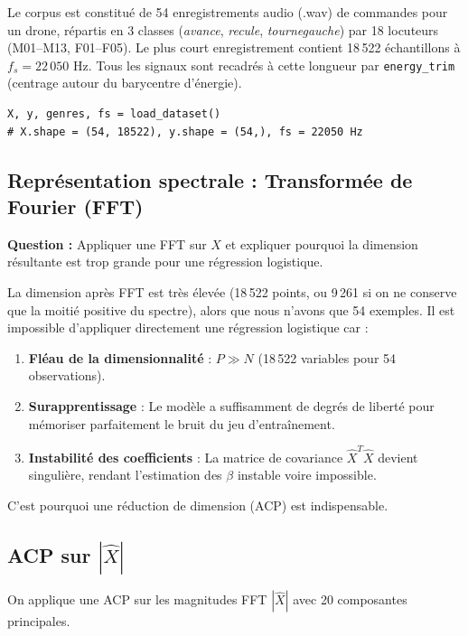 \documentclass{name}
\begin{document}
Le corpus est constitué de 54 enregistrements audio (.wav) de commandes pour un drone, répartis en 3 classes (\textit{avance}, \textit{recule}, \textit{tournegauche}) par 18 locuteurs (M01--M13, F01--F05). Le plus court enregistrement contient 18\,522 échantillons à $f_s = 22\,050$ Hz. Tous les signaux sont recadrés à cette longueur par \texttt{energy\_trim} (centrage autour du barycentre d'énergie).

\begin{lstlisting}[caption={Chargement du dataset}]
X, y, genres, fs = load_dataset()
# X.shape = (54, 18522), y.shape = (54,), fs = 22050 Hz
\end{lstlisting}

\subsection{Représentation spectrale : Transformée de Fourier (FFT)}

\textbf{Question :} Appliquer une FFT sur $X$ et expliquer pourquoi la dimension résultante est trop grande pour une régression logistique.

La dimension après FFT est très élevée (18\,522 points, ou 9\,261 si on ne conserve que la moitié positive du spectre), alors que nous n'avons que 54 exemples. Il est impossible d'appliquer directement une régression logistique car :

\begin{enumerate}
    \item \textbf{Fléau de la dimensionnalité} : $P \gg N$ (18\,522 variables pour 54 observations).
    \item \textbf{Surapprentissage} : Le modèle a suffisamment de degrés de liberté pour mémoriser parfaitement le bruit du jeu d'entraînement.
    \item \textbf{Instabilité des coefficients} : La matrice de covariance $\hat{X}^T\hat{X}$ devient singulière, rendant l'estimation des $\beta$ instable voire impossible.
\end{enumerate}

C'est pourquoi une réduction de dimension (ACP) est indispensable.

\subsection{ACP sur $|\hat{X}|$}

On applique une ACP sur les magnitudes FFT $|\hat{X}|$ avec 20 composantes principales.
\end{document}
